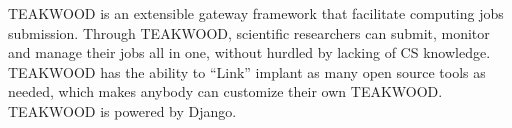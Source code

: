 TEAKWOOD is an extensible gateway framework that facilitate computing jobs submission. Through TEAKWOOD, scientific researchers can submit, monitor and manage their jobs all in one, without hurdled by lacking of CS knowledge. TEAKWOOD has the ability to “Link” implant as many open source tools as needed, which makes anybody can customize their own TEAKWOOD. TEAKWOOD is powered by Django.
